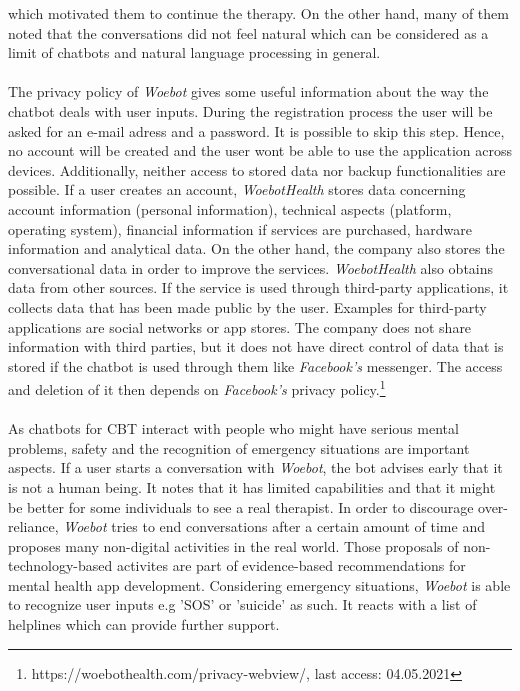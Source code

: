 \documentclass[sigconf, nonacm]{acmart}
\begin{document}
which motivated them to continue the therapy. On the other hand, many of them noted that the conversations did not feel natural which can be considered as a limit of chatbots
and natural language processing in general.\cite{Fitzpatrick2017}
\\\\
The privacy policy of \emph{Woebot} gives some useful information about the way the chatbot deals with user inputs. 
During the registration process the user will be asked for an e-mail adress and a password. It is possible to skip
this step. Hence, no account will be created and the user wont be able to use the application across devices. 
Additionally, neither access to stored data nor backup functionalities are possible. If a user creates an account, \emph{WoebotHealth} stores
data concerning account information (personal information), technical aspects (platform, operating system), financial information if 
services are purchased, hardware information and analytical data. On the other hand, the company also stores the conversational data in order
to improve the services. \emph{WoebotHealth} also obtains data from other sources. If the service is used through third-party applications, 
it collects data that has been made public by the user. Examples for third-party applications are social networks or app stores. 
The company does not share information with third parties, but it does not have direct control of data that is stored if the chatbot
is used through them like \emph{Facebook's} messenger. The access and deletion of it then depends on \emph{Facebook's} privacy policy.\footnote{https://woebothealth.com/privacy-webview/, last access: 04.05.2021}
\\\\
As chatbots for CBT interact with people who might have serious mental problems, safety and the recognition of emergency situations are important
aspects. If a user starts a conversation with \emph{Woebot}, the bot advises early that it is not a human being. It notes that it has limited capabilities and that it might 
be better for some individuals to see a real therapist. In order to discourage over-reliance, \emph{Woebot} tries to end conversations after a certain amount of time and proposes many non-digital activities in the real world.
Those proposals of non-technology-based activites are part of evidence-based recommendations for mental health app development\cite{Bakker2016}.
Considering emergency situations, \emph{Woebot} is able to recognize user inputs e.g 'SOS' or 'suicide' as such. It reacts with a list of helplines
which can provide further support.\cite{Kretzschmar2019}
\end{document}
